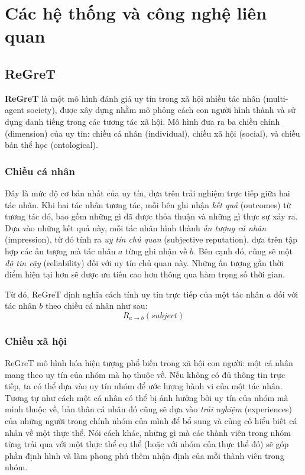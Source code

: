 \chapter{Các hệ thống và công nghệ liên quan}

\section{ReGreT}

\textbf{ReGreT} \cite{regret-reputation-system} là một mô hình đánh giá uy tín trong xã hội nhiều tác nhân (multi-agent society), được xây dựng nhằm mô phỏng cách con người hình thành và sử dụng danh tiếng trong các tương tác xã hội.
Mô hình đưa ra ba chiều chính (dimension) của uy tín: chiều cá nhân (individual), chiều xã hội (social), và chiều bản thể học (ontological).

\subsection{Chiều cá nhân}

Đây là mức độ cơ bản nhất của uy tín, dựa trên trải nghiệm trực tiếp giữa hai tác nhân. Khi hai tác nhân tương tác, mỗi bên ghi nhận \textit{kết quả} (outcomes) từ tương tác đó, bao gồm những gì đã được thỏa thuận và những gì thực sự xảy ra.
Dựa vào những kết quả này, mỗi tác nhân hình thành \textit{ấn tượng cá nhân} (impression), từ đó tính ra \textit{uy tín chủ quan} (subjective reputation), dựa trên tập hợp các ấn tượng mà tác nhân $a$ từng ghi nhận về $b$.
Bên cạnh đó, cũng sẽ một
\textit{độ tin cậy} (reliability) đối với uy tín chủ quan này. Những ấn tượng gần thời điểm hiện tại hơn sẽ được ưu tiên cao hơn thông qua hàm trọng số thời gian.

Từ đó, ReGreT định nghĩa cách tính uy tín trực tiếp của một tác nhân $a$ đối với tác nhân $b$ theo chiều cá nhân như sau:
\[R_{a \rightarrow b}(subject)\]

\subsection{Chiều xã hội}

ReGreT mô hình hóa hiện tượng phổ biến trong xã hội con người: một cá nhân mang theo uy tín của nhóm mà họ thuộc về. Nếu không có đủ thông tin trực tiếp, ta có thể dựa vào uy tín nhóm để ước lượng hành vi của một tác nhân.
Tương tự như cách một cá nhân có thể bị ảnh hưởng bởi uy tín của nhóm mà mình thuộc về, bản thân cá nhân đó cũng sẽ dựa vào \textit{trải nghiệm} (experiences) của những người trong chính nhóm của mình để bổ sung và củng cố hiểu biết cá nhân về một thực thể.
Nói cách khác, những gì mà các thành viên trong nhóm từng trải qua với một thực thể cụ thể (hoặc với nhóm của thực thể đó) sẽ góp phần định hình và làm phong phú thêm nhận định của mỗi thành viên trong nhóm.

